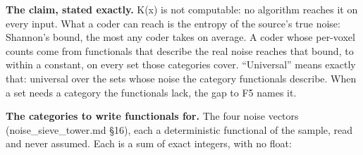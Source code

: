 \textbf{The claim, stated exactly.} K(x) is not computable: no algorithm reaches it on every input. What a coder can reach is the entropy of the source's true noise: Shannon's bound, the most any coder takes on average. A coder whose per-voxel counts come from functionals that describe the real noise reaches that bound, to within a constant, on every set those categories cover. “Universal” means exactly that: universal over the sets whose noise the category functionals describe. When a set needs a category the functionals lack, the gap to F5 names it.

\textbf{The categories to write functionals for.} The four noise vectors (noise\_\allowbreak{}sieve\_\allowbreak{}tower.md §16), each a deterministic functional of the sample, read and never assumed. Each is a sum of exact integers, with no float:

